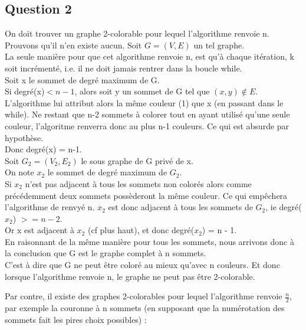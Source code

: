 \subsection{Question 2}\label{ex15_q2}
On doit trouver un graphe 2-colorable pour lequel l'algorithme renvoie n.\\
Prouvons qu'il n'en existe aucun.
Soit $G = (V,E)$ un tel graphe.\\
La seule mani\`ere pour que cet algorithme renvoie n, est qu'\`a chaque it\'eration, k
soit incr\'ement\'e, i.e. il ne doit jamais rentrer dans la boucle while.\\
Soit x le sommet de degr\'e maximum de G.\\
Si degr\'e(x)$ < n - 1$, alors soit y un sommet de G tel que $(x,y) \notin E$.
L'algorithme lui attribut alors la m\^eme couleur (1) que x (en passant dans le while).
Ne restant que n-2 sommets \`a colorer tout en ayant utilis\'e qu'une seule couleur,
l'algoritme renverra donc au plus n-1 couleurs. Ce qui est absurde par hypoth\`ese.\\
Donc degr\'e(x) = n-1.\\
Soit $G_2 = (V_2,E_2)$ le sous graphe de G priv\'e de x.\\
On note $x_2$ le sommet de degr\'e maximum de $G_2$.\\
Si $x_2$ n'est pas adjacent \`a tous les sommets non color\'es alors comme
pr\'ec\'edemment deux sommets poss\`ederont la m\^eme couleur. Ce qui emp\^echera
l'algorithme de renvy\'e n. $x_2$ est donc adjacent \`a tous les sommets de $G_2$, ie
degr\'e($x_2$) $>= n-2$.\\
Or x est adjacent \`a $x_2$ (cf plus haut), et donc degr\'e($x_2$) = n - 1.\\
En raisonnant de la m\^eme mani\`ere pour tous les sommets, nous arrivons donc \`a la
conclusion que G est le graphe complet \`a n sommets.\\
C'est \`a dire que G ne peut \^etre color\'e au mieux qu'avec n couleurs. Et donc lorsque
l'algorithme renvoie n, le graphe ne peut pas \^etre 2-colorable.

Par contre, il existe des graphes 2-colorables pour lequel l'algorithme renvoie
$\frac{n}{2}$, par exemple la couronne \`a n sommets (en supposant que la num\'erotation
des sommets fait les pires choix possibles) :


